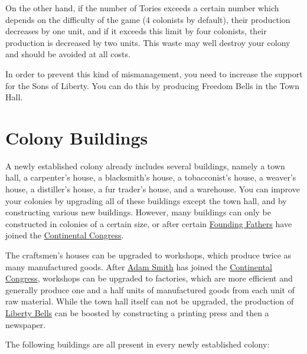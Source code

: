 \documentclass[12pt]{book}
\begin{document}
On the other hand, if the number of Tories exceeds a certain number
which depends on the difficulty of the game (4 colonists by default),
their production decreases by one unit, and if it exceeds this limit
by four colonists, their production is decreased by two units. This
waste may well destroy your colony and should be avoided at all
costs.

In order to prevent this kind of mismanagement, you need to increase
the support for the Sons of Liberty. You can do this by producing
Freedom Bells in the Town Hall.


\hypertarget{Colony Buildings}{\section{Colony Buildings}}

A newly established colony already includes several buildings, namely
a town hall, a carpenter's house, a blacksmith's house, a
tobacconist's house, a weaver's house, a distiller's house, a fur
trader's house, and a warehouse. You can improve your colonies by
upgrading all of these buildings except the town hall, and by
constructing various new buildings. However, many buildings can only
be constructed in colonies of a certain size, or after certain
\hyperlink{Founding Fathers}{Founding Fathers} have joined the
\hyperlink{Continental Congress}{Continental Congress}.

The craftsmen's houses can be upgraded to workshops, which produce
twice as many manufactured goods. After \hyperlink{Adam Smith}{Adam
  Smith} has joined the \hyperlink{Continental Congress}{Continental
  Congress}, workshops can be upgraded to factories, which are more
efficient and generally produce one and a half units of manufactured
goods from each unit of raw material. While the town hall itself can
not be upgraded, the production of \hyperlink{Liberty Bells}{Liberty
  Bells} can be boosted by constructing a printing press and then a
newspaper.

The following buildings are all present in every newly established
colony:
\end{document}
